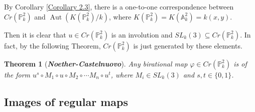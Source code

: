 \documentclass{ctexart}
\newtheorem{theorem}{Theorem}[section]
\newcommand{\aut}{\operatorname{Aut}}
\begin{document}
By Corollary \ref{Corollary 2.3}, there is a one-to-one correspondence between $Cr(\mathbb{P}_{k}^{2})$ and $\aut(K(\mathbb{P}_{k}^{2})/k)$, 
where $K(\mathbb{P}_{k}^{2}) = K(\mathbb{A}_{k}^{2}) = k(x, y)$.
\par
Then it is clear that $u\in Cr(\mathbb{P}_{k}^{2})$ is an involution and $SL_{k}(3) \subseteq Cr(\mathbb{P}_{k}^{2})$.
In fact, by the following Theorem, $Cr(\mathbb{P}_{k}^{2})$ is just generated by these elements.
\begin{theorem}[\textbf{\emph{Noether-Castelnuovo}}]
    Any birational map $\varphi\in Cr(\mathbb{P}_{k}^{2})$ is of the form $u^{s} \circ M_{1} \circ u \circ M_{2} \circ \cdots M_{n} \circ u^{t}$,
    where $M_{i}\in SL_{k}(3)$ and $s,t\in \{0, 1\}$.
    \label{Theorem 3.2}
\end{theorem}

\subsection{Images of regular maps}
\label{subsection:Blow_Up_Images_of_regular_maps}
\end{document}
